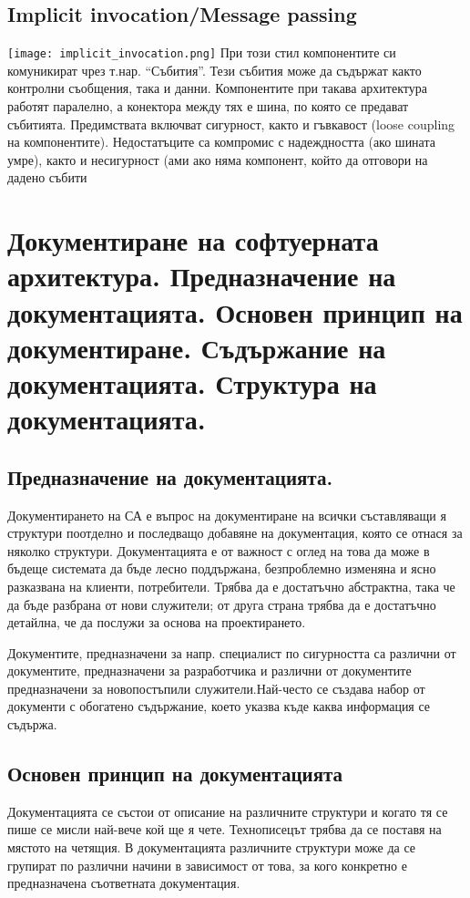 \documentclass[fleqn,12pt]{article}
\begin{document}
\subsection{Implicit invocation/Message passing}
\texttt{[image: implicit\_invocation.png]}
При този стил компонентите си комуникират чрез т.нар. “Събития”. Тези събития може да съдържат както контролни съобщения, така и данни. Компонентите при такава архитектура работят паралелно, а конектора между тях е шина, по която се предават събитията. Предимствата включват сигурност, както и гъвкавост (loose coupling на компонентите). Недостатъците са компромис с надеждността (ако шината умре), както и несигурност (ами ако няма компонент, който да отговори на дадено събити

\section{Документиране на софтуерната архитектура. Предназначение на документацията. Основен принцип на документиране. Съдържание на документацията. Структура на документацията.}

\subsection{Предназначение на документацията.}
Документирането на СА е въпрос на документиране на всички съставляващи я структури поотделно и последващо добавяне на документация, която се отнася за няколко структури.
Документацията е от важност с оглед на това да може в бъдеще системата да бъде
лесно поддържана, безпроблемно изменяна и ясно разказвана на клиенти, потребители.
Трябва да е достатъчно абстрактна, така че да бъде разбрана от нови служители; от друга страна трябва да е достатъчно детайлна, че да послужи за основа на проектирането. 

Документите, предназначени за напр. специалист по сигурността са различни от документите, предназначени за разработчика и различни от документите предназначени за новопостъпили служители.Най-често се създава набор от документи с обогатено съдържание, което указва къде каква информация се съдържа.

\subsection{Основен принцип на документацията}
Документацията се състои от описание на различните структури и когато тя се пише се
мисли най-вече кой ще я чете. Технописецът трябва да се поставя на мястото на
четящия. В документацията различните структури може да се групират по различни
начини в зависимост от това, за кого конкретно е предназначена съответната
документация.
\end{document}
